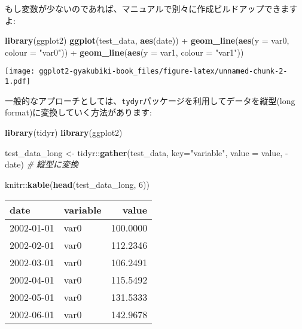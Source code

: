 \documentclass[]{book}
\newenvironment{Shaded}{\begin{snugshade}}{\end{snugshade}}
\newcommand{\KeywordTok}[1]{\textcolor[rgb]{0.13,0.29,0.53}{\textbf{{#1}}}}
\newcommand{\DataTypeTok}[1]{\textcolor[rgb]{0.13,0.29,0.53}{{#1}}}
\newcommand{\DecValTok}[1]{\textcolor[rgb]{0.00,0.00,0.81}{{#1}}}
\newcommand{\StringTok}[1]{\textcolor[rgb]{0.31,0.60,0.02}{{#1}}}
\newcommand{\CommentTok}[1]{\textcolor[rgb]{0.56,0.35,0.01}{\textit{{#1}}}}
\newcommand{\NormalTok}[1]{{#1}}
\begin{document}
もし変数が少ないのであれば、マニュアルで別々に作成ビルドアップできますよ:

\begin{Shaded}
\begin{Highlighting}[]
\KeywordTok{library}\NormalTok{(ggplot2)}
\KeywordTok{ggplot}\NormalTok{(test_data, }\KeywordTok{aes}\NormalTok{(date)) +}
\StringTok{  }\KeywordTok{geom_line}\NormalTok{(}\KeywordTok{aes}\NormalTok{(}\DataTypeTok{y =} \NormalTok{var0, }\DataTypeTok{colour =} \StringTok{"var0"}\NormalTok{)) +}
\StringTok{  }\KeywordTok{geom_line}\NormalTok{(}\KeywordTok{aes}\NormalTok{(}\DataTypeTok{y =} \NormalTok{var1, }\DataTypeTok{colour =} \StringTok{"var1"}\NormalTok{))}
\end{Highlighting}
\end{Shaded}

\texttt{[image: ggplot2-gyakubiki-book\_files/figure-latex/unnamed-chunk-2-1.pdf]}

一般的なアプローチとしては、\texttt{tydyr}パッケージを利用してデータを縦型(long
format)に変換していく方法があります:

\begin{Shaded}
\begin{Highlighting}[]
\KeywordTok{library}\NormalTok{(tidyr)}
\KeywordTok{library}\NormalTok{(ggplot2)}

\NormalTok{test_data_long <-}\StringTok{ }\NormalTok{tidyr::}\KeywordTok{gather}\NormalTok{(test_data, }\DataTypeTok{key=}\StringTok{"variable"}\NormalTok{, }\DataTypeTok{value =} \NormalTok{value, -date) }\CommentTok{# 縦型に変換}

\NormalTok{knitr::}\KeywordTok{kable}\NormalTok{(}\KeywordTok{head}\NormalTok{(test_data_long, }\DecValTok{6}\NormalTok{))}
\end{Highlighting}
\end{Shaded}

\begin{tabular}{l|l|r}
\hline
date & variable & value\\
\hline
2002-01-01 & var0 & 100.0000\\
\hline
2002-02-01 & var0 & 112.2346\\
\hline
2002-03-01 & var0 & 106.2491\\
\hline
2002-04-01 & var0 & 115.5492\\
\hline
2002-05-01 & var0 & 131.5333\\
\hline
2002-06-01 & var0 & 142.9678\\
\hline
\end{tabular}
\end{document}
